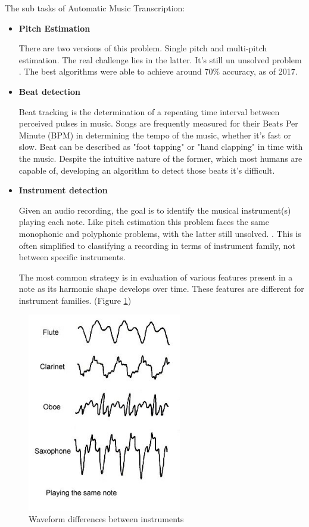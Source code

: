\par
The sub tasks of Automatic Music Transcription:
\begin{itemize}
	\item \textbf{Pitch Estimation}
	\par
	There are two versions of this problem. Single pitch and multi-pitch estimation. The real challenge lies in the latter. It's still un unsolved problem \cite{glass_ceiling}.
	The best algorithms were able to achieve around 70\% accuracy, as of 2017. \cite{music_retrieval}
	\item \textbf{Beat detection}
	\par
	Beat tracking is the determination of a repeating time interval between perceived pulses in music. \cite{transcription}
	Songs are frequently measured for their Beats Per Minute (BPM) in determining the tempo of the music, whether it's fast or slow.
	Beat can be described as "foot tapping" or "hand clapping" in time with the music. Despite the intuitive nature of the former, which most humans are capable of, developing an algorithm to detect those beats it's difficult.
	\item \textbf{Instrument detection}
	\par
	Given an audio recording, the goal is to identify the musical instrument(s) playing each note. Like pitch estimation this problem faces the same monophonic and polyphonic problems, with the latter still unsolved. \cite{instrument_identification}. This is often simplified to classifying a recording in terms of instrument family, not between specific instruments.
	\par
	The most common strategy is in evaluation of various features present in a note as its harmonic shape develops over time. These features are different for instrument families. (Figure \ref{fig:instruments})
\end{itemize}

\begin{figure}[h]
	\caption[Waveform differences between instruments]{Waveform differences between instruments \cite{waves_instruments}}
	\centering
	\label{fig:instruments}
	\includegraphics[width=0.6\textwidth, height=0.4\textheight, keepaspectratio]{"resources/instruments"}
\end{figure}

